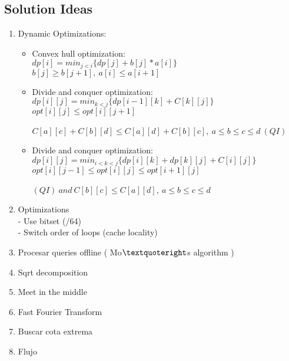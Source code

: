 \documentclass[7pt,twocolumn, landscape, letterpaper,bfseries]{article}
\begin{document}
\subsection*{Solution Ideas}
		 \begin{enumerate}
			\item 		Dynamic Optimizations:
				\begin{itemize}
					\item Convex hull optimization:\\
						\text{ * }$dp[i] = min_{j < i} \{dp[j] + b[j]*a[i]\}$\\
						\text{ * }$b[j] \geq b[j+1],\  a[i] \leq a[i+1]$\\
					\item Divide and conquer optimization:\\
						\text{ * }$dp[i][j] = min_{k < j} \{dp[i-1][k] + C[k][j]\}$\\
						\text{ * }$opt[i][j] \leq opt[i][j + 1]$\\
						\\
						$C[a][c]+C[b][d] \leq C[a][d]+C[b][c], \ a \leq b \leq c \leq d \ (QI)$ 
					\item Divide and conquer optimization:\\
						\text{ * }$dp[i][j] = min_{i<k<j} \{dp[i][k] + dp[k][j] + C[i][j]\}$\\
						\text{ * }$opt[i][j-1] \leq opt[i][j] \leq opt[i+1][j]$\\
						\\
						$(QI) \  and \  C[b][c] \leq C[a][d],  \ a \leq b \leq c \leq d$ 
				\end{itemize}
			\item Optimizations\\
				- Use bitset (/64)\\
				- Switch order of loops (cache locality)
			\item Procesar queries offline ( Mo$\textquoteright$s algorithm )
			\item Sqrt decomposition
			\item Meet in the middle
			\item Fast Fourier Transform
			\item Buscar cota extrema
			\item Flujo
		\end{enumerate}	
\end{document}
